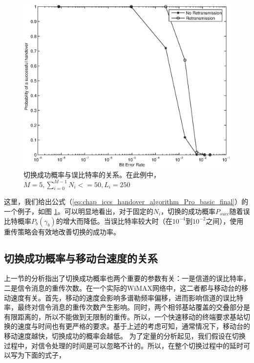 \begin{figure}[htbp]
\begin{centering}
\includegraphics[scale=0.6]{iccs_ber_prob}
\par\end{centering}
\caption{切换成功概率与误比特率的关系。在此例中，$M=5,\sum_{i=0}^{M-1}N_i<=50,L_i=250$}
\label{fig:chap_iccs_handover_algorithm_PBER}
\end{figure}
这里，我们给出公式（\ref{eq:chap_iccs_handover_algorithm_Pro_basic_final}）的一个例子，如图 \ref{fig:chap_iccs_handover_algorithm_PBER}。可以明显地看出，对于固定的$N_i$，切换的成功概率$P_{succ}$随着误比特概率$P_b(\gamma_b)$的增大而降低。当误比特率较大时（在$10^{-4}$到$10^{-2}$之间），使用重传策略会有效地改善切换的成功率。

\subsection{切换成功概率与移动台速度的关系}
上一节的分析指出了切换成功概率也两个重要的参数有关：一是信道的误比特率，二是信令消息的重传次数。在一个实际的WiMAX网络中，这二者都与移动台的移动速度有关。首先，移动的速度会影响多谱勒频率偏移，进而影响信道的误比特率，最终对信令消息的重传次数产生影响。同时，两个相邻基站覆盖的交叠部分是有限距离的，所以不能做到无限制的重传。所以，一个快速移动的终端要求基站切换的速度与时间也有更严格的要求。基于上述的考虑可知，通常情况下，移动台的移动速度越快，切换成功的概率会越低。
为了定量的分析起见，我们假设在切换过程中，对信令处理的时间是可以忽略不计的。所以，在整个切换过程中的延时可以写为下面的式子，

